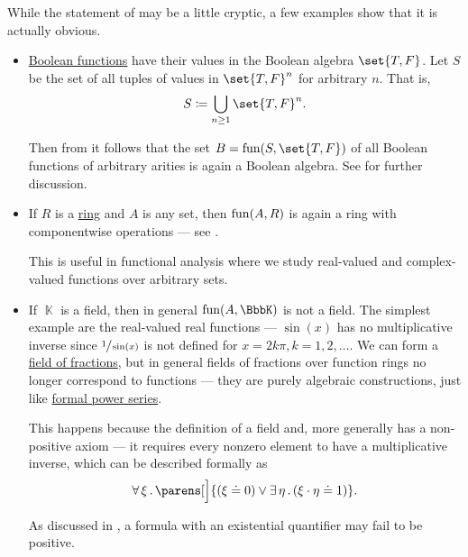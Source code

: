 \begin{example}\label{ex:thm:functions_over_model_of_positive_formulas_form_model}
  While the statement of  may be a little cryptic, a few examples show that it is actually obvious.
  \begin{itemize}
    \item \hyperref[def:boolean_function]{Boolean functions} have their values in the Boolean algebra \( \set{ T, F } \). Let \( S \) be the set of all tuples of values in \( \set{ T, F }^n \) for arbitrary \( n \). That is,
    \begin{equation*}
      S \coloneqq \bigcup_{n \geq 1} \set{ T, F }^n.
    \end{equation*}

    Then from  it follows that the set \( B = \fun(S, \set{ T, F }) \) of all Boolean functions of arbitrary arities is again a Boolean algebra. See  for further discussion.

    \item If \( R \) is a \hyperref[def:ring]{ring} and \( A \) is any set, then \( \operatorname{fun}(A, R) \) is again a ring with componentwise operations --- see .

    This is useful in functional analysis where we study real-valued and complex-valued functions over arbitrary sets.

    \item If \( \BbbK \) is a field, then in general \( \fun(A, \BbbK) \) is not a field. The simplest example are the real-valued real functions --- \( \sin(x) \) has no multiplicative inverse since \( \sfrac 1 {\sin(x)} \) is not defined for \( x = 2k\pi, k = 1, 2, \ldots \). We can form a \hyperref[def:ring_localization]{field of fractions}, but in general fields of fractions over function rings no longer correspond to functions --- they are purely algebraic constructions, just like \hyperref[def:formal_power_series]{formal power series}.

    This happens because the definition of a field and, more generally has a non-positive axiom --- it requires every nonzero element to have a multiplicative inverse, which can be described formally as
    \begin{equation*}
      \qforall \xi \parens[\Big]{ (\xi \doteq 0) \vee \qexists \eta (\xi \cdot \eta \doteq 1) }.
    \end{equation*}

    As discussed in , a formula with an existential quantifier may fail to be positive.
  \end{itemize}
\end{example}

